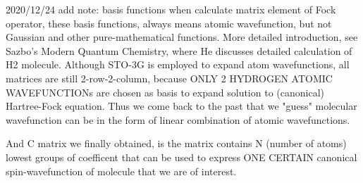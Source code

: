 2020/12/24 add note:
basis functions when calculate matrix element of Fock operator, these basis functions, always means atomic wavefunction, but not Gaussian and other pure-mathematical functions.
More detailed introduction, see Sazbo's Modern Quantum Chemistry, where He discusses detailed calculation of H2 molecule. Although STO-3G is employed to expand atom wavefunctions, all matrices are still 2-row-2-column, because ONLY 2 HYDROGEN ATOMIC WAVEFUNCTIONs are chosen as basis to expand solution to (canonical) Hartree-Fock equation.
Thus we come back to the past that we "guess" molecular wavefunction can be in the form of linear combination of atomic wavefunctions.

And C matrix we finally obtained, is the matrix contains N (number of atoms) lowest groups of coefficent that can be used to express ONE CERTAIN canonical spin-wavefunction of molecule that we are of interest.

